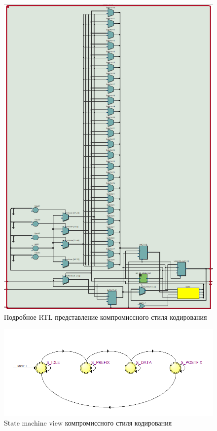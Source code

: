 \documentclass[a4paper,14pt]{article}
\begin{document}
	\begin{figure}[H]
		\centering
		\includegraphics[width=0.9\linewidth]{images/9_3_rtl2}
		\caption{Подробное RTL представление компромиссного стиля кодирования}
		\label{fig:9_3_rtl2}
	\end{figure}

	\begin{figure}[H]
		\centering
		\includegraphics[width=0.9\linewidth]{images/9_3_state}
		\caption{State machine view компромиссного стиля кодирования}
		\label{fig:9_3_state}
	\end{figure}
\end{document}
